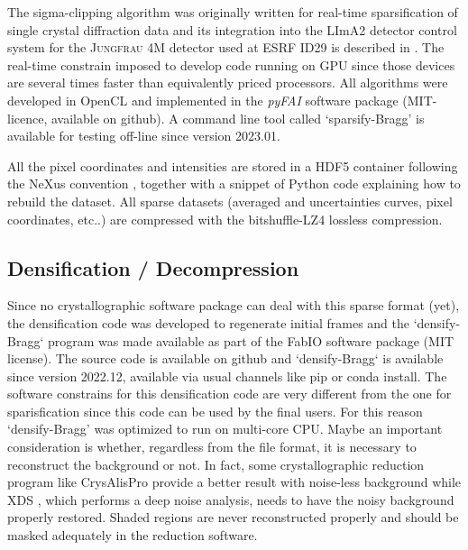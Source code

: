 \documentclass[preprint]{iucr}              %
\begin{document}
The sigma-clipping algorithm was originally written for real-time sparsification of single crystal diffraction data and its integration into the LImA2 detector control system \cite{lima} for the \textsc{Jungfrau} 4M detector used at ESRF ID29 is described in \cite{sri2021}.
The real-time constrain imposed to develop code running on GPU since those devices are several times
faster than equivalently priced processors.
All algorithms were developed in OpenCL \cite{opencl_khronos} and implemented in the \textit{pyFAI} software package (MIT-licence, available on github).
A command line tool called `sparsify-Bragg' is available for testing off-line since version 2023.01.

All the pixel coordinates and intensities are stored in a HDF5 container \cite{hdf5} following the NeXus  convention \cite{nexus}, together with a snippet of Python code explaining how to rebuild the dataset.
All sparse datasets (averaged and uncertainties curves, pixel coordinates, etc..) are compressed with the bitshuffle-LZ4 \cite{bitshuffle} lossless compression.

\subsection{Densification / Decompression}
Since no crystallographic software package can deal with this sparse format (yet), the densification code was developed to regenerate initial frames and the `densify-Bragg` program was made available as part of the FabIO \cite{fabio} software package (MIT license). 
The source code is available on github and `densify-Bragg` is available since version 2022.12, available via usual channels like pip or conda install. 
The software constrains for this densification code are very different from the one for sparisfication since this code can be used by the final users.
For this reason `densify-Bragg' was optimized to run on multi-core CPU.
Maybe an important consideration is whether, regardless from the file format, it is necessary to reconstruct the background or not. 
In fact, some crystallographic reduction program like CrysAlisPro \cite{crysalis} provide a better result with noise-less background while XDS \cite{xds}, which performs a deep noise analysis, needs to have the noisy background properly restored.
Shaded regions are never reconstructed properly and should be masked adequately in the reduction software.
\end{document}
